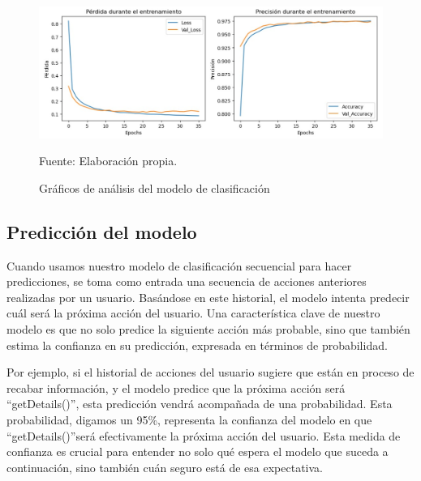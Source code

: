 \begin{figure}[H]
    \begin{minipage}[t]{0.9\textwidth}
        \caption{Gráficos de análisis del modelo de clasificación}
        \label{gráfico_clasificación}        
    \end{minipage}

    \vspace{10pt}

    \begin{minipage}[b]{1\textwidth}
        \centering
        \includegraphics[width=\textwidth]{img/Gráfico modelo clasificación.jpg}        
    \end{minipage}

    \begin{minipage}[t]{0.9\textwidth}
        Fuente: Elaboración propia.
    \end{minipage}
\end{figure}

\subsection{Predicción del modelo}

Cuando usamos nuestro modelo de clasificación secuencial para hacer predicciones, se toma como entrada una secuencia de acciones anteriores realizadas por un usuario. Basándose en este historial, el modelo intenta predecir cuál será la próxima acción del usuario. Una característica clave de nuestro modelo es que no solo predice la siguiente acción más probable, sino que también estima la confianza en su predicción, expresada en términos de probabilidad.

Por ejemplo, si el historial de acciones del usuario sugiere que están en proceso de recabar información, y el modelo predice que la próxima acción será \textquotedblleft getDetails()\textquotedblright, esta predicción vendrá acompañada de una probabilidad. Esta probabilidad, digamos un 95\%, representa la confianza del modelo en que \textquotedblleft getDetails()\textquotedblright será efectivamente la próxima acción del usuario. Esta medida de confianza es crucial para entender no solo qué espera el modelo que suceda a continuación, sino también cuán seguro está de esa expectativa.

